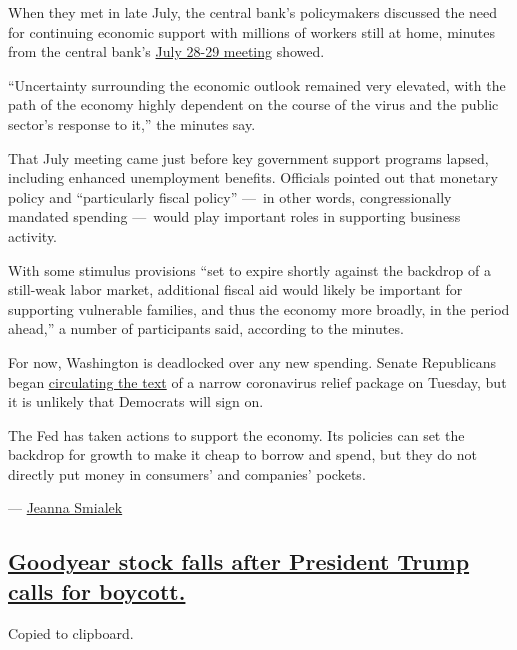 When they met in late July, the central bank's policymakers discussed
the need for continuing economic support with millions of workers still
at home, minutes from the central bank's
\href{https://www.federalreserve.gov/monetarypolicy/fomccalendars.htm}{July
28-29 meeting} showed.

``Uncertainty surrounding the economic outlook remained very elevated,
with the path of the economy highly dependent on the course of the virus
and the public sector's response to it,'' the minutes say.

That July meeting came just before key government support programs
lapsed, including enhanced unemployment benefits. Officials pointed out
that monetary policy and ``particularly fiscal policy'' ---~in other
words, congressionally mandated spending ---~would play important roles
in supporting business activity.

With some stimulus provisions ``set to expire shortly against the
backdrop of a still-weak labor market, additional fiscal aid would
likely be important for supporting vulnerable families, and thus the
economy more broadly, in the period ahead,'' a number of participants
said, according to the minutes.

For now, Washington is deadlocked over any new spending. Senate
Republicans began
\href{https://www.nytimes3xbfgragh.onion/2020/08/18/us/politics/republicans-coronavirus-stimulus-bill.html}{circulating
the text} of a narrow coronavirus relief package on Tuesday, but it is
unlikely that Democrats will sign on.

The Fed has taken actions to support the economy. Its policies can set
the backdrop for growth to make it cheap to borrow and spend, but they
do not directly put money in consumers' and companies' pockets.

--- \href{https://www.nytimes3xbfgragh.onion/by/jeanna-smialek}{Jeanna
Smialek}

\hypertarget{goodyear-stock-falls-after-president-trump-calls-for-boycott}{%
\subsection{\texorpdfstring{\protect\hyperlink{goodyear-stock-falls-after-president-trump-calls-for-boycott}{Goodyear
stock falls after President Trump calls for
boycott.}}{Goodyear stock falls after President Trump calls for boycott.}}\label{goodyear-stock-falls-after-president-trump-calls-for-boycott}}

Copied to clipboard.

